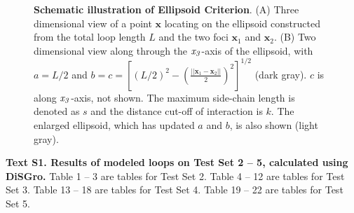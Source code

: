 \begin{figure}[!hp]
  \caption{{\bf Schematic illustration of Ellipsoid Criterion}. (A) Three dimensional view of a point $\mathbf{x}$ locating on the ellipsoid
  constructed from the total loop length $L$ and the two foci $\mathbf{x}_1$ and $\mathbf{x}_2$. (B) Two dimensional view along through the ${\it x_3}$-axis of the ellipsoid,
  with $a = L/2$ and $b = c = [(L/2)^2 - (\frac{||\mathbf{x}_1 -
\mathbf{x}_2||}{2})^2]^{1/2}$ (dark gray). $c$ is along ${\it
x_3}$-axis, not shown. The maximum side-chain length is denoted as
$s$ and the distance cut-off of interaction is $k$. The enlarged
ellipsoid, which has updated $a$ and $b$, is also shown (light
gray).
  \label{fig:ellipsoid}}
\end{figure}
\begin{suppfigure}
\begin{flushleft} {\bf{Text S1. Results of modeled loops on Test Set 2 -- 5, calculated
using {\sc DiSGro}.}} Table 1 -- 3 are tables for Test Set 2. Table
4 -- 12 are tables for Test Set 3. Table 13 -- 18 are tables for
Test Set 4. Table 19 -- 22 are tables for Test Set 5.
\end{flushleft}
\end{suppfigure}
